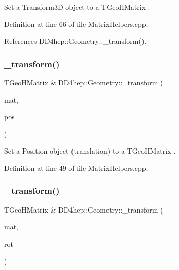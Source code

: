 Set a Transform3D object to a T\+Geo\+H\+Matrix . 



Definition at line 66 of file Matrix\+Helpers.\+cpp.



References D\+D4hep\+::\+Geometry\+::\+\_\+transform().

\hypertarget{group___d_d4_h_e_p___g_e_o_m_e_t_r_y_ga115e4b33b3d4b31fc0c2a2de57c8a14b}{}\label{group___d_d4_h_e_p___g_e_o_m_e_t_r_y_ga115e4b33b3d4b31fc0c2a2de57c8a14b} 
\subsubsection{\texorpdfstring{\+\_\+transform()}{\_transform()}\hspace{0.1cm}{\footnotesize\ttfamily [7/11]}}
{\footnotesize\ttfamily T\+Geo\+H\+Matrix \& D\+D4hep\+::\+Geometry\+::\+\_\+transform (\begin{DoxyParamCaption}\item[{T\+Geo\+H\+Matrix \&}]{mat,  }\item[{const \hyperlink{namespace_d_d4hep_1_1_geometry_a55083902099d03506c6db01b80404900}{Geometry\+::\+Position} \&}]{pos }\end{DoxyParamCaption})}



Set a Position object (translation) to a T\+Geo\+H\+Matrix . 



Definition at line 49 of file Matrix\+Helpers.\+cpp.

\hypertarget{group___d_d4_h_e_p___g_e_o_m_e_t_r_y_gae00745e30557512fe1da42fc705d42d1}{}\label{group___d_d4_h_e_p___g_e_o_m_e_t_r_y_gae00745e30557512fe1da42fc705d42d1} 
\subsubsection{\texorpdfstring{\+\_\+transform()}{\_transform()}\hspace{0.1cm}{\footnotesize\ttfamily [8/11]}}
{\footnotesize\ttfamily T\+Geo\+H\+Matrix \& D\+D4hep\+::\+Geometry\+::\+\_\+transform (\begin{DoxyParamCaption}\item[{T\+Geo\+H\+Matrix \&}]{mat,  }\item[{const \hyperlink{namespace_d_d4hep_1_1_geometry_a24667b2b9c3cec3d5239828db4d52189}{Geometry\+::\+Rotation\+Z\+YX} \&}]{rot }\end{DoxyParamCaption})}




